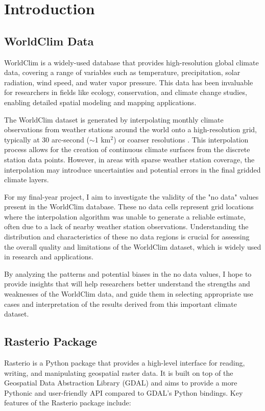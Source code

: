 \documentclass[a4paper,14pt] {report}
\begin{document}
	\chapter{Introduction}
	\section{WorldClim Data}
	WorldClim is a widely-used database that provides high-resolution global climate data, covering a range of variables such as temperature, precipitation, solar radiation, wind speed, and water vapor pressure. This data has been invaluable for researchers in fields like ecology, conservation, and climate change studies, enabling detailed spatial modeling and mapping applications.
			
	The WorldClim dataset is generated by interpolating monthly climate observations from weather stations around the world onto a high-resolution grid, typically at 30 arc-second ($\sim$1 km$^2$) or coarser resolutions . This interpolation process allows for the creation of continuous climate surfaces from the discrete station data points. However, in areas with sparse weather station coverage, the interpolation may introduce uncertainties and potential errors in the final gridded climate layers.
			
	For my final-year project, I aim to investigate the validity of the "no data" values present in the WorldClim database. These no data cells represent grid locations where the interpolation algorithm was unable to generate a reliable estimate, often due to a lack of nearby weather station observations. Understanding the distribution and characteristics of these no data regions is crucial for assessing the overall quality and limitations of the WorldClim dataset, which is widely used in research and applications.
			
	By analyzing the patterns and potential biases in the no data values, I hope to provide insights that will help researchers better understand the strengths and weaknesses of the WorldClim data, and guide them in selecting appropriate use cases and interpretation of the results derived from this important climate dataset.
		
	\section{Rasterio Package}
	Rasterio is a Python package that provides a high-level interface for reading, writing, and manipulating geospatial raster data. It is built on top of the Geospatial Data Abstraction Library (GDAL) and aims to provide a more Pythonic and user-friendly API compared to GDAL's Python bindings.
	Key features of the Rasterio package include:
	
\end{document}
